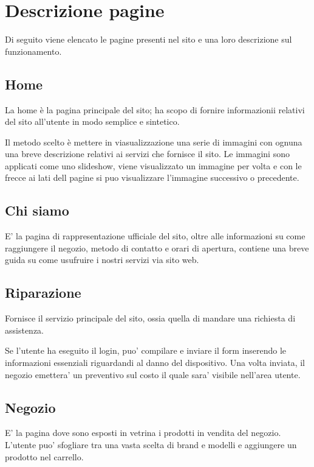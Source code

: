 \section{Descrizione pagine}

Di seguito viene elencato le pagine presenti nel sito e una loro descrizione sul funzionamento.

\subsection{Home}

La home è la pagina principale del sito; ha scopo di fornire informazionii relativi del sito
all'utente in modo semplice e sintetico.

Il metodo scelto è mettere in viasualizzazione una serie di immagini con ognuna una breve
descrizione relativi ai servizi che fornisce il sito. Le immagini sono applicati come uno slideshow,
viene visualizzato un immagine per volta e con le frecce ai lati dell pagine si puo visualizzare l'immagine
successivo o precedente.

\subsection{Chi siamo}

E' la pagina di rappresentazione ufficiale del sito, oltre alle informazioni su come raggiungere
il negozio, metodo di contatto e orari di apertura, contiene una breve guida su come 
usufruire i nostri servizi via sito web.

\subsection{Riparazione}

Fornisce il servizio principale del sito, ossia quella di mandare una richiesta di assistenza.

Se l'utente ha eseguito il login, puo' compilare e inviare il form inserendo le informazioni essenziali riguardandi
al danno del dispositivo. Una volta inviata, il negozio emettera' un preventivo sul costo il quale sara' visibile nell'area
utente.

\subsection{Negozio}

E' la pagina dove sono esposti in vetrina i prodotti in vendita del negozio. L'utente puo' 
sfogliare tra una vasta scelta di brand e modelli e aggiungere un prodotto nel carrello.

